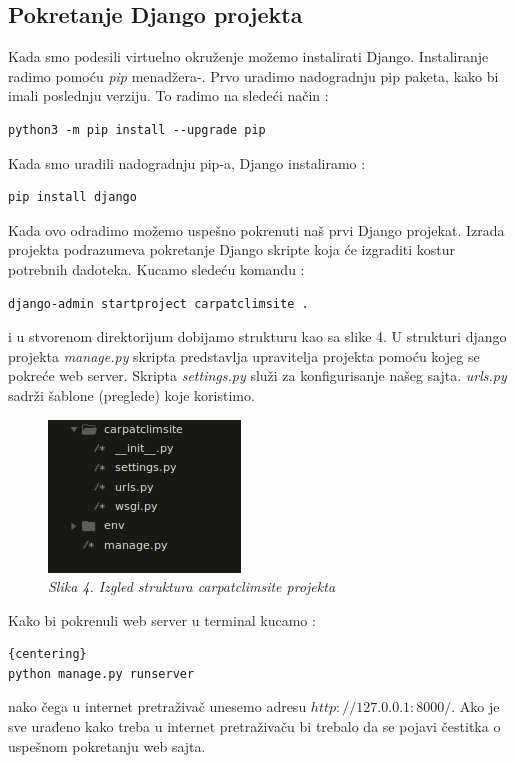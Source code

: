 \documentclass[12pt]{article}
\begin{document}
\subsection{Pokretanje Django projekta}
Kada smo podesili virtuelno okruženje možemo instalirati Django.  Instaliranje radimo pomoću  \textsl{pip} menadžera-. Prvo uradimo nadogradnju pip paketa, kako bi imali poslednju verziju. To radimo na sledeći način :
\begin{lstlisting}
python3 -m pip install --upgrade pip
\end{lstlisting} 
Kada smo uradili nadogradnju pip-a, Django instaliramo :
\begin{lstlisting}
pip install django
\end{lstlisting}
Kada ovo odradimo možemo uspešno pokrenuti naš prvi Django projekat. Izrada projekta podrazumeva pokretanje Django skripte koja će izgraditi kostur potrebnih dadoteka. Kucamo sledeću komandu :
\begin{lstlisting}
django-admin startproject carpatclimsite .
\end{lstlisting} 
i u stvorenom direktorijum dobijamo strukturu kao sa slike 4. U strukturi django projekta \textsl{manage.py} skripta predstavlja upravitelja projekta pomoću kojeg se pokreće web server. Skripta        \textsl{settings.py} služi za konfigurisanje našeg sajta. \textsl{urls.py} sadrži šablone (preglede) koje koristimo.
\begin{figure}[h!]
\centering
\includegraphics[width=0.5\linewidth]{kostur.png}
\caption*{\textsl{Slika 4. Izgled struktura carpatclimsite projekta}}
\end{figure}
Kako bi pokrenuli web server u terminal kucamo : 
\begin{lstlisting}{centering}
python manage.py runserver
\end{lstlisting}nako čega u internet pretraživač unesemo adresu $http://127.0.0.1:8000/$.  Ako je sve urađeno kako treba u internet pretraživaču bi trebalo da se pojavi čestitka o uspešnom pokretanju web sajta.
\end{document}
